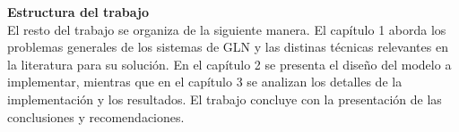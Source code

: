 
    \textbf{Estructura del trabajo}\\

    El resto del trabajo se organiza de la siguiente manera. El capítulo 1 aborda los problemas generales de los sistemas de GLN 
y las distinas técnicas relevantes en la literatura para su solución. En el capítulo 2 se presenta el diseño del modelo a implementar, mientras 
que en el capítulo 3 se analizan los detalles de la implementación y los resultados. El trabajo concluye con la presentación de las 
conclusiones y recomendaciones.